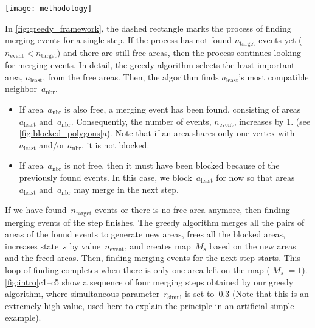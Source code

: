 \documentclass[twocolumn]{svjour3}          %
\begin{document}
\begin{figure*}[tb]
\centering
\texttt{[image: methodology]}
\caption{The process of finding simultaneous merging events for a single step.
    (a) From all the free areas,
	the least important one is selected to merge into
	its most compatible neighbor.
	Then,  the surrounding areas are blocked 
	(marked by the crosses).
	(b) Next, the least important area from the remaining free areas
	is selected to merge with its most compatible neighbor,
	and the relevant areas are also blocked.
}
\label{fig:blocked_polygons}
\end{figure*}

In \fig\ref{fig:greedy_framework},
the dashed rectangle marks the process of 
finding merging events for a single step.
If the process has not found $n_\mathrm{target}$ events yet
($n_\mathrm{event} < n_\mathrm{target}$)
and there are still free areas,
then the process continues looking for merging events.
In detail, the greedy algorithm selects the least important area, 
$a_\mathrm{least}$, from the free areas.
Then, the algorithm finds $a_\mathrm{least}$'s 
most compatible neighbor~$a_\mathrm{nbr}$.
\begin{itemize}[noitemsep,topsep=0pt]
\item If area~$a_\mathrm{nbr}$ is also free, 
a merging event has been found,
consisting of areas~$a_\mathrm{least}$ and~$a_\mathrm{nbr}$.
Consequently, the number of events, $n_\mathrm{event}$, increases by 1.
(see \fig\ref{fig:blocked_polygons}a).
Note that if an area shares only one vertex 
with $a_\mathrm{least}$ and/or $a_\mathrm{nbr}$, it is not blocked.
\item If area~$a_\mathrm{nbr}$ is not free,
then it must have been blocked because of the previously found events.
In this case, we block~$a_\mathrm{least}$ for now
so that areas~$a_\mathrm{least}$ and~$a_\mathrm{nbr}$ 
may merge in the next step.
\end{itemize}


If we have found~$n_\mathrm{target}$ events 
or there is no free area anymore,
then finding merging events of the step finishes.
The greedy algorithm merges all the pairs of areas of the found events
to generate new areas,
frees all the blocked areas,
increases state~$s$ by value~$n_\mathrm{event}$,
and creates map~$M_s$ based on the new areas and the freed areas.
Then, finding merging events for the next step starts.
This loop of finding completes 
when there is only one area left on the map ($|M_s|=1$).
\figs\ref{fig:intro}c1--c5 show a sequence of four merging steps
obtained by our greedy algorithm,
where simultaneous parameter~$r_\mathrm{simul}$ is set to~$0.3$
(Note that this is an extremely high value, 
used here to explain the principle in an artificial simple example).
\end{document}
